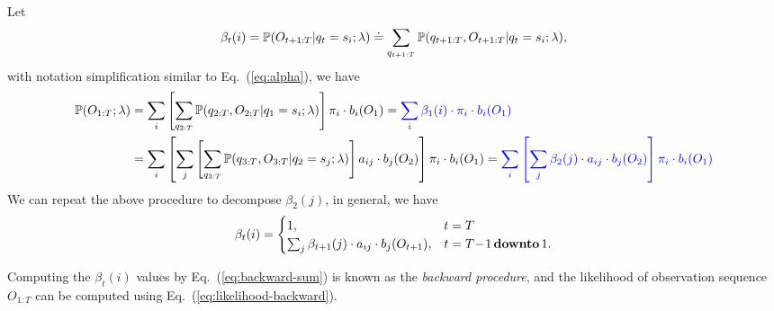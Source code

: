 Let 
\begin{equation}
\label{eq:beta}
\beta_t(i) = \mathbb{P}(O_{t+1:T} |q_t = s_i; \lambda) \doteq \sum_{q_{t+1:T}} \mathbb{P}(q_{t+1:T}, O_{t+1:T} |q_t = s_i; \lambda),
\end{equation}
with notation simplification similar to Eq.~(\ref{eq:alpha}), we have
\begin{alignat}{2}
\mathbb{P}(O_{1:T} ;\lambda) 
&= \sum_{i} \left[ \sum_{q_{2:T}} \mathbb{P}(q_{2:T}, O_{2:T} |q_1 = s_i; \lambda) \right] \pi_i \cdot b_i(O_1) 
 = {\color{blue}{\sum_{i} \beta_1(i) \cdot \pi_i \cdot b_i(O_1)}}  \label{eq:likelihood-backward} \\
&= \sum_{i} \left[ \sum_{j} \left[ \sum_{q_{3:T}} \mathbb{P}(q_{3:T}, O_{3:T} |q_2 = s_j; \lambda) \right] a_{ij} \cdot b_j(O_2) \right] \pi_i \cdot b_i(O_1) 
 = {\color{blue}{\sum_{i} \left[ \sum_{j} \beta_2(j) \cdot a_{ij} \cdot b_j(O_2) \right] \pi_i \cdot b_i(O_1)}}  \nonumber
\end{alignat}
We can repeat the above procedure to decompose $\beta_2(j)$, in general, we have
\begin{equation}
\label{eq:backward-sum}
\beta_t(i) = \begin{cases}
              1, & t=T \\
              \sum_{j} \beta_{t+1}(j) \cdot a_{ij} \cdot b_j(O_{t+1}), & t=T\!-\!1 \,\textbf{downto}\, 1.
             \end{cases}
\end{equation}

Computing the $\beta_t(i)$ values by Eq.~(\ref{eq:backward-sum}) is known as the \emph{backward procedure}, 
and the likelihood of observation sequence $O_{1:T}$ can be computed using Eq.~(\ref{eq:likelihood-backward}).

